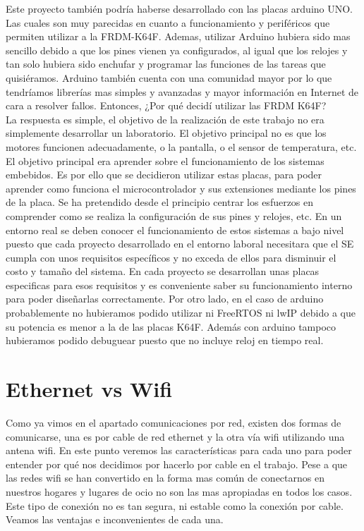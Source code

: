 Este proyecto también podría haberse desarrollado con las placas arduino UNO. Las cuales son muy parecidas en cuanto a funcionamiento y periféricos que permiten utilizar a la FRDM-K64F. Ademas, utilizar Arduino hubiera sido mas sencillo debido a que los pines vienen ya configurados, al igual que los relojes y tan solo hubiera sido enchufar y programar las funciones de las tareas que quisiéramos. Arduino también cuenta con una comunidad mayor por lo que tendríamos librerías mas simples y avanzadas y mayor información en Internet de cara a resolver fallos. Entonces, ¿Por qué decidí utilizar las FRDM K64F?\\
La respuesta es simple, el objetivo de la realización de este trabajo no era simplemente desarrollar un laboratorio. El objetivo principal no es que los motores funcionen adecuadamente, o la pantalla, o el sensor de temperatura, etc. El objetivo principal era aprender sobre el funcionamiento de los sistemas embebidos. Es por ello que se decidieron utilizar estas placas, para poder aprender como funciona el microcontrolador y sus extensiones mediante los pines de la placa. Se ha pretendido desde el principio centrar los esfuerzos en comprender como se realiza la configuración de sus pines y relojes, etc. En un entorno real se deben conocer el funcionamiento de estos sistemas a bajo nivel puesto que cada proyecto desarrollado en el entorno laboral necesitara que el SE cumpla con unos requisitos específicos y no exceda de ellos para disminuir el costo y tamaño del sistema. En cada proyecto se desarrollan unas placas especificas para esos requisitos y es conveniente saber su funcionamiento interno para poder diseñarlas correctamente.
Por otro lado, en el caso de arduino probablemente no hubieramos podido utilizar ni FreeRTOS ni lwIP debido a que su potencia es menor a la de las placas K64F. Además con arduino tampoco hubieramos podido debuguear puesto que no incluye reloj en tiempo real.


\section{Ethernet vs Wifi}\label{sec:ETHvsWIFI}
Como ya vimos en el apartado comunicaciones por red, existen dos formas de comunicarse, una es por cable de red ethernet y la otra vía wifi utilizando una antena wifi. En este punto veremos las características para cada uno para poder entender por qué nos decidimos por hacerlo por cable en el trabajo.
Pese a que las redes wifi se han convertido en la forma mas común de conectarnos en nuestros hogares y lugares de ocio no son las mas apropiadas en todos los casos. Este tipo de conexión no es tan segura, ni estable como la conexión por cable. Veamos las ventajas e inconvenientes de cada una.

